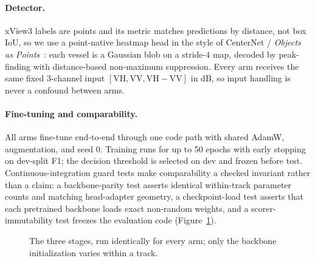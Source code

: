 \documentclass[10pt,twocolumn,letterpaper]{article}
\begin{document}
\paragraph{Detector.} xView3 labels are points and its metric matches
predictions by distance, not box IoU, so we use a point-native heatmap head in
the style of CenterNet / \emph{Objects as Points}~\cite{zhou2019objects}: each
vessel is a Gaussian blob on a stride-4 map, decoded by peak-finding with
distance-based non-maximum suppression. Every arm receives the same fixed
3-channel input $[\mathrm{VH},\mathrm{VV},\mathrm{VH}{-}\mathrm{VV}]$ in dB, so
input handling is never a confound between arms.

\paragraph{Fine-tuning and comparability.} All arms fine-tune end-to-end
through one code path with shared AdamW, augmentation, and seed 0. Training
runs for up to 50 epochs with early stopping on dev-split F1; the decision
threshold is selected on dev and frozen before test. Continuous-integration
guard tests make comparability a checked invariant rather than a claim: a
backbone-parity test asserts identical within-track parameter counts and
matching head-adapter geometry, a checkpoint-load test asserts that each
pretrained backbone loads exact non-random weights, and a
scorer-immutability test freezes the evaluation code
(Figure~\ref{fig:pipeline}).

\begin{figure}[t]
\centering
{}
\caption{The three stages, run identically for every arm; only the backbone
initialization varies within a track.}
\label{fig:pipeline}
\end{figure}
\end{document}
